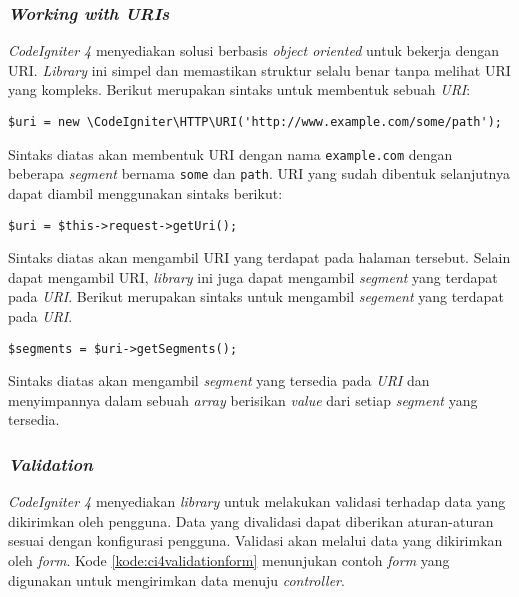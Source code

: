 \subsubsection{\textit{Working with URIs}}
\textit{CodeIgniter 4} menyediakan solusi berbasis \textit{object oriented} untuk bekerja dengan URI. \textit{Library} ini simpel dan memastikan struktur selalu benar tanpa melihat URI yang kompleks. Berikut merupakan sintaks untuk membentuk sebuah \textit{URI}:
\begin{center}
	\verb|$uri = new \CodeIgniter\HTTP\URI('http://www.example.com/some/path');|
\end{center}
Sintaks diatas akan membentuk URI dengan nama \texttt{example.com} dengan beberapa \textit{segment} bernama \texttt{some} dan \texttt{path}. URI yang sudah dibentuk selanjutnya dapat diambil menggunakan sintaks berikut:
\begin{center}
	\verb|$uri = $this->request->getUri();|
\end{center}
Sintaks diatas akan mengambil URI yang terdapat pada halaman tersebut. Selain dapat mengambil URI, \textit{library} ini juga dapat mengambil \textit{segment} yang terdapat pada \textit{URI}. Berikut merupakan sintaks untuk mengambil \textit{segement} yang terdapat pada \textit{URI}.
\begin{center}
	\verb|$segments = $uri->getSegments();|
\end{center}
Sintaks diatas akan mengambil \textit{segment} yang tersedia pada \textit{URI} dan menyimpannya dalam sebuah \textit{array} berisikan \textit{value} dari setiap \textit{segment} yang tersedia.

\subsubsection{\textit{Validation}}
\textit{CodeIgniter 4} menyediakan \textit{library} untuk melakukan validasi terhadap data yang dikirimkan oleh pengguna. Data yang divalidasi dapat diberikan aturan-aturan sesuai dengan konfigurasi pengguna. Validasi akan melalui data yang dikirimkan oleh \textit{form}. Kode \ref{kode:ci4validationform} menunjukan contoh \textit{form} yang digunakan untuk mengirimkan data menuju \textit{controller}.

